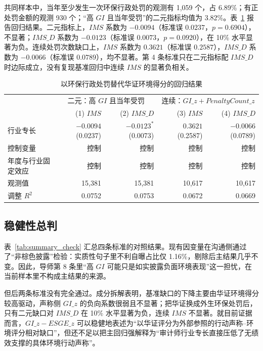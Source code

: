\documentclass[12pt,a4paper]{article}
\begin{document}
共同样本中，当年至少发生一次环保行政处罚的观测有 1,059 个，占 6.89\%；有正处罚金额的观测 930 个；``高 $GI$ 且当年受罚''的二元指标均值为 3.82\%。表~\ref{tab:penalty_gap} 报告回归结果。二元指标上，$IMS$ 系数为 $-0.0094$（标准误 $0.0237$，$p=0.6904$），不显著；$IMS\_D$ 系数为 $-0.0123$（标准误 $0.0073$，$p=0.0920$），在 10\% 水平显著为负。连续处罚次数缺口上，$IMS$ 系数为 $0.3621$（标准误 $0.2587$），$IMS\_D$ 系数为 $-0.0066$（标准误 $0.0789$），均不显著。第 4 条标准只在二元指标配 $IMS\_D$ 时边际成立，没有复现基准回归中连续 $IMS$ 的显著负相关。

\begin{table}[htbp]
\centering
\caption{以环保行政处罚替代华证环境得分的回归结果}
\label{tab:penalty_gap}
\renewcommand{\arraystretch}{1.25}
\begin{tabular}{lrrrr}
\toprule
 & \multicolumn{2}{c}{二元：高 $GI$ 且当年受罚} & \multicolumn{2}{c}{连续：$GI\_z + PenaltyCount\_z$} \\
\cmidrule(lr){2-3}\cmidrule(lr){4-5}
 & (1) $IMS$ & (2) $IMS\_D$ & (3) $IMS$ & (4) $IMS\_D$ \\
\midrule
行业专长 & \shortstack{$-0.0094$\\(0.0237)} & \shortstack{$-0.0123^{*}$\\(0.0073)} & \shortstack{$0.3621$\\(0.2587)} & \shortstack{$-0.0066$\\(0.0789)} \\
控制变量 & 控制 & 控制 & 控制 & 控制 \\
年度与行业固定效应 & 控制 & 控制 & 控制 & 控制 \\
观测值 & 15,381 & 15,381 & 10,617 & 10,617 \\
调整 $R^2$ & 0.0752 & 0.0753 & 0.0672 & 0.0669 \\
\bottomrule
\end{tabular}
\end{table}

\subsection{稳健性总判}

表~\ref{tab:summary_check} 汇总四条标准的对照结果。现有因变量在沟通侧通过了``非棕色披露''检验：实质性句子里不利自曝占比仅 1.16\%，剔除后主结果几乎不变。因此，导师第 8 条里``高 $GI$ 可能只是如实披露负面环境表现''这一担忧，在当前样本里不构成主结果的来源。

但后两条标准没有完全通过。成分拆解表明，基准缺口的下降主要由华证环境得分较高驱动，声称侧 $GI\_z$ 的负向系数很弱且不显著；把华证换成外生环保处罚后，只有二元缺口对 $IMS\_D$ 在 10\% 水平显著为负，连续 $IMS$ 不显著。就目前证据而言，$GI\_z-ESGE\_z$ 可以稳健地表述为``以华证评分为外部参照的行动声称--环境评分相对缺口''，但还不足以把主回归强解释为``审计师行业专长直接压低了无绩效支撑的具体环境行动声称''。
\end{document}

